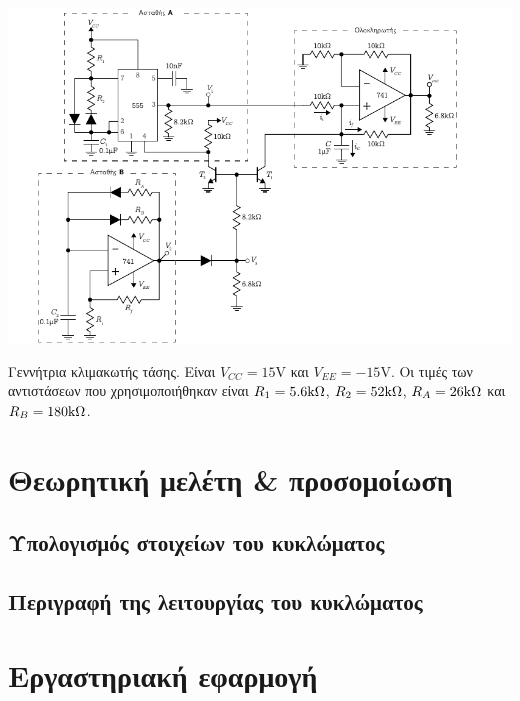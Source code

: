 \begin{center}
	\begin{circuitfig}[H]
		\includegraphics[width=14cm]{circuits/micro3_lab2.pdf}
		\caption{Γεννήτρια κλιμακωτής τάσης. Είναι $V_{CC}=15\unit{\volt}$ και $V_{EE}=-15\unit{\volt}$. Οι τιμές των αντιστάσεων που χρησιμοποιήθηκαν είναι $R_1=5.6\kohm$, $R_2=52\kohm$, $R_A=26\kohm$ και $R_B=180\kohm$.}
		\label{circ:2_schematic}
	\end{circuitfig}
\end{center}

\section{Θεωρητική μελέτη \& προσομοίωση}

	\subsection{Υπολογισμός στοιχείων του κυκλώματος}
		

	\subsection{Περιγραφή της λειτουργίας του κυκλώματος}
		

\newpage
\section{Εργαστηριακή εφαρμογή}
	